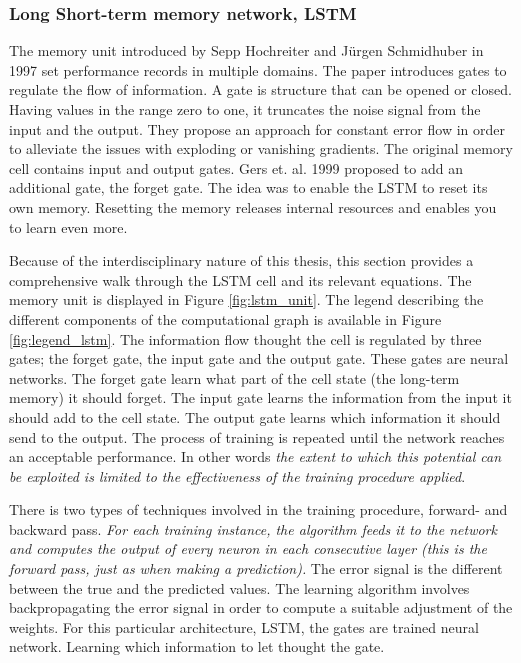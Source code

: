 \documentclass{article}
\begin{document}
\subsubsection{Long Short-term memory network, LSTM} \label{sec:lstm}
The memory unit introduced by Sepp Hochreiter and Jürgen Schmidhuber in 1997 set performance records in multiple domains. The paper introduces gates to regulate the flow of information. A gate is structure that can be opened or closed. Having values in the range zero to one, it truncates the noise signal from the input and the output. They propose an approach for constant error flow in order to alleviate the issues with exploding or vanishing gradients. The original memory cell contains input and output gates. Gers et. al. 1999 proposed to add an additional gate, the forget gate. The idea was to enable the LSTM to reset its own memory. Resetting the memory releases internal resources and enables you to learn even more.

Because of the interdisciplinary nature of this thesis, this section provides a comprehensive walk through the LSTM cell and its relevant equations. The memory unit is displayed in Figure \ref{fig:lstm_unit}. The legend describing the different components of the computational graph is available in Figure \ref{fig:legend_lstm}. The information flow thought the cell is regulated by three gates; the forget gate, the input gate and the output gate. These gates are neural networks. The forget gate learn what part of the cell state (the long-term memory) it should forget. The input gate learns the information from the input it should add to the cell state. The output gate learns which information it should send to the output. The process of training is repeated until the network reaches an acceptable performance. In other words \textit{the extent to which this potential can be exploited is limited to the effectiveness of the training procedure applied}. 

There is two types of techniques involved in the training procedure, forward- and backward pass. \textit{For each training instance, the algorithm feeds it to the network and computes the output of every neuron in each consecutive layer (this is the forward pass, just as when making a prediction).} %
The error signal is the different between the true and the predicted values. The learning algorithm involves backpropagating the error signal in order to compute a suitable adjustment of the weights. For this particular architecture, LSTM, the gates are trained neural network. Learning which information to let thought the gate.
\end{document}
